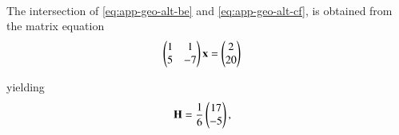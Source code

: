 \\ \solution
%
The intersection of 
		\eqref{eq:app-geo-alt-be}
		and
		\eqref{eq:app-geo-alt-cf},
		is obtained from 
		the matrix equation
\begin{align}
        \begin{pmatrix}1&1\\5&-7\end{pmatrix} \mathbf{x} &= \begin{pmatrix}2\\20\end{pmatrix}
\end{align}
%

yielding
%
\begin{align}
        \mathbf{H}&=\frac{1}{6}\begin{pmatrix}{17}\\-{5}\end{pmatrix}
		\label{eq:app-geo-alt-H},
\end{align}
%

